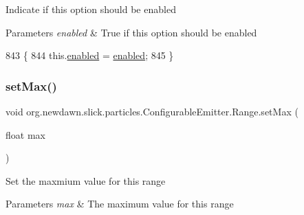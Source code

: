 Indicate if this option should be enabled


\begin{DoxyParams}{Parameters}
{\em enabled} & True if this option should be enabled \\
\hline
\end{DoxyParams}

\begin{DoxyCode}
843                                                 \{
844             this.\mbox{\hyperlink{classorg_1_1newdawn_1_1slick_1_1particles_1_1_configurable_emitter_1_1_range_a8e14b5a19b817ff49fb52b9d3dd303ce}{enabled}} = \mbox{\hyperlink{classorg_1_1newdawn_1_1slick_1_1particles_1_1_configurable_emitter_1_1_range_a8e14b5a19b817ff49fb52b9d3dd303ce}{enabled}};
845         \}
\end{DoxyCode}
\mbox{\label{classorg_1_1newdawn_1_1slick_1_1particles_1_1_configurable_emitter_1_1_range_a4951a74e98d5a055803ebc59d269c472}} 
\subsubsection{\texorpdfstring{set\+Max()}{setMax()}}
{\footnotesize\ttfamily void org.\+newdawn.\+slick.\+particles.\+Configurable\+Emitter.\+Range.\+set\+Max (\begin{DoxyParamCaption}\item[{float}]{max }\end{DoxyParamCaption})\hspace{0.3cm}{\ttfamily [inline]}}

Set the maxmium value for this range


\begin{DoxyParams}{Parameters}
{\em max} & The maximum value for this range \\
\hline
\end{DoxyParams}

